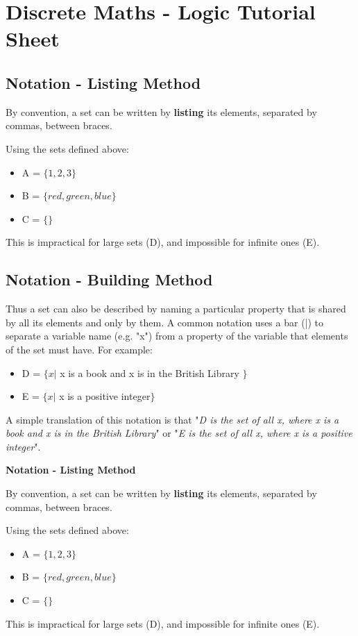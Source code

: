 \documentclass[11pt,a4paper,titlepage,oneside,openany]{article}
\numberwithin{equation}{section}
\numberwithin{algorithm}{section}
\numberwithin{figure}{section}
\numberwithin{table}{section}
\begin{document}
\section{Discrete Maths - Logic Tutorial Sheet}


\subsection{Notation - Listing Method}

By convention, a set can be written by \textbf{listing} its elements, separated by commas, between {braces}. 

Using the sets defined above:
\begin{itemize}
\item A = $\{1, 2, 3\}$
\item B = $\{red, green, blue\}$
\item C = $\{\}$
\end{itemize}
This is impractical for large sets (D), and impossible for infinite ones (E). 
\subsection{Notation - Building Method}
Thus a set can also be described by naming a particular property that is shared by all its elements and only by them. A common notation uses a bar (|) to separate a variable name (e.g. "x") from a property of the variable that elements of the set must have. For example:
\begin{itemize}
\item D = $\{x |$ x is a book and x is in the British Library $\}$
\item E = $\{x |$ x is a positive integer$\}$
\end{itemize}
A simple translation of this notation is that "\textit{D is the set of all x, where x is a book and x is in the British Library}" or "\textit{E is the set of all x, where x is a positive integer}".


\textbf{Notation - Listing Method}

By convention, a set can be written by \textbf{listing} its elements, separated by commas, between {braces}. 

Using the sets defined above:
\begin{itemize}
\item A = $\{1, 2, 3\}$
\item B = $\{red, green, blue\}$
\item C = $\{\}$
\end{itemize}
This is impractical for large sets (D), and impossible for infinite ones (E). 
\end{document}
